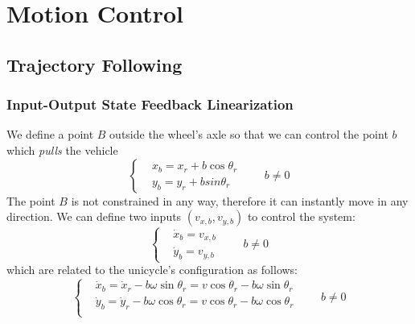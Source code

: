 \documentclass{book}
\theoremstyle{definition}
\theoremstyle{remark}
\theoremstyle{remark}
\begin{document}
\section{Motion Control}
\subsection{Trajectory Following}
\subsubsection{Input-Output State Feedback Linearization}
We define a point $B$ outside the wheel's axle so that we can control the point $b$ which \emph{pulls} the vehicle
\[
    \left\{\begin{aligned}
        &x_b = x_r + b\cos\theta_r \\
        &y_b = y_r + bsin\theta_r
    \end{aligned}\right.\qquad  b\neq 0
\]
The point $B$ is not constrained in any way, therefore it can instantly move in any direction. We can define two inputs $(v_{x,b}, v_{y,b})$ to control the system: 
\[
    \left\{\begin{aligned}
        &\dot{x}_b = v_{x,b} \\
        &\dot{y}_b = v_{y,b}
    \end{aligned}\right.\qquad  b\neq 0
\]
which are related to the unicycle's configuration as follows: 
\[
    \left\{\begin{align}
            &\dot{x}_b = \dot{x}_r-b\omega\sin\theta_r = v\cos\theta_r-b\omega\sin\theta_r \\
            &\dot{y}_b = \dot{y}_r-b\omega\cos\theta_r = v\cos\theta_r-b\omega\cos\theta_r \\
    \end{align}\right. \qquad b\neq 0
\]
\end{document}
